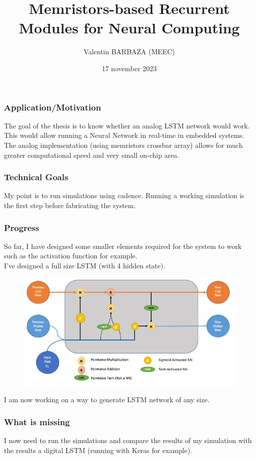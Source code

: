 \documentclass{beamer}
\title[MSc Thesis]
{Memristors-based Recurrent Modules for Neural Computing}
\institute[IST] %
{%
  Diogo Caetano\\
  INESC-MN
  \and%
  Ruxandra Barlulescu\\
  INESC-ID
  }
\author[V. BARBAZA]{Valentin BARBAZA (MEEC)}
\date[2023] %
  {17 november 2023}
\begin{document}
  \frame{\titlepage}


  \begin{frame}
    \frametitle{Application/Motivation}
    The goal of the thesis is to know whether an analog LSTM network would work. This would allow running a Neural Network in real-time in embedded systems. The analog implementation (using memristors crossbar array) allows for much greater computational speed and very small on-chip area.
  \end{frame}
  \begin{frame}
    \frametitle{Technical Goals}
    My point is to run simulations using cadence. Running a working simulation is the first step before fabricating the system.
  \end{frame}
  \begin{frame}
    \frametitle{Progress}
    So far, I have designed some smaller elements required for the system to work such as the activation function for example.\\
    I've designed a full size LSTM (with 4 hidden state).
    \begin{figure}
      \centering
      \includegraphics[height=0.35\textheight]{lstm/lstm.png}
    \end{figure}
    I am now working on a way to generate LSTM network of any size.
  \end{frame}

  \begin{frame}
    \frametitle{What is missing}
    I now need to run the simulations and compare the results of my simulation with the results a digital LSTM (running with Keras for example).
  \end{frame}

  
\end{document}
